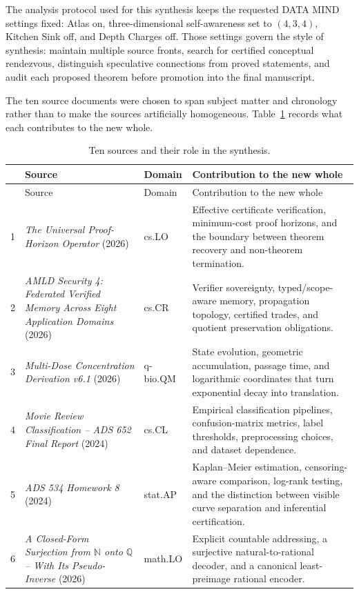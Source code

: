 \documentclass[11pt]{article}
\theoremstyle{special}
\theoremstyle{definition}
\newcommand{\Nat}{\mathbb N}
\newcommand{\Rat}{\mathbb Q}
\begin{document}
The analysis protocol used for this synthesis keeps the requested DATA MIND settings fixed: Atlas on, three-dimensional self-awareness set to $(4,3,4)$, Kitchen Sink off, and Depth Charges off. Those settings govern the style of synthesis: maintain multiple source fronts, search for certified conceptual rendezvous, distinguish speculative connections from proved statements, and audit each proposed theorem before promotion into the final manuscript.

The ten source documents were chosen to span subject matter and chronology rather than to make the sources artificially homogeneous. Table~\ref{tab:sources} records what each contributes to the new whole.

\begin{longtable}{p{}p{}p{}p{}}
\caption{Ten sources and their role in the synthesis.}\label{tab:sources}\\
\toprule
& Source & Domain & Contribution to the new whole\\
\midrule
\endfirsthead
\toprule
& Source & Domain & Contribution to the new whole\\
\midrule
\endhead
1 & \emph{The Universal Proof-Horizon Operator} (2026) & cs.LO & Effective certificate verification, minimum-cost proof horizons, and the boundary between theorem recovery and non-theorem termination.\\
2 & \emph{AMLD Security 4: Federated Verified Memory Across Eight Application Domains} (2026) & cs.CR & Verifier sovereignty, typed/scope-aware memory, propagation topology, certified trades, and quotient preservation obligations.\\
3 & \emph{Multi-Dose Concentration Derivation v6.1} (2026) & q-bio.QM & State evolution, geometric accumulation, passage time, and logarithmic coordinates that turn exponential decay into translation.\\
4 & \emph{Movie Review Classification -- ADS 652 Final Report} (2024) & cs.CL & Empirical classification pipelines, confusion-matrix metrics, label thresholds, preprocessing choices, and dataset dependence.\\
5 & \emph{ADS 534 Homework 8} (2024) & stat.AP & Kaplan--Meier estimation, censoring-aware comparison, log-rank testing, and the distinction between visible curve separation and inferential certification.\\
6 & \emph{A Closed-Form Surjection from $\Nat$ onto $\Rat$ -- With Its Pseudo-Inverse} (2026) & math.LO & Explicit countable addressing, a surjective natural-to-rational decoder, and a canonical least-preimage rational encoder.\\

\end{longtable}
\end{document}
